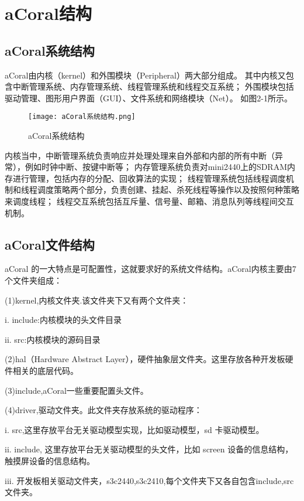 \chapter{aCoral结构}

\section{aCoral系统结构}
aCoral由内核（kernel）和外围模块（Peripheral）两大部分组成。
其中内核又包含中断管理系统、内存管理系统、线程管理系统和线程交互系统；
外围模块包括驱动管理、图形用户界面（GUI）、文件系统和网络模块（Net）。
如图2-1所示。

\begin{figure}[H]
	\texttt{[image: aCoral系统结构.png]}
	\caption{aCoral系统结构}
	\label{pica}
\end{figure}

内核当中，中断管理系统负责响应并处理处理来自外部和内部的所有中断（异常），例如时钟中断、按键中断等；
内存管理系统负责对mini2440上的SDRAM内存进行管理，包括内存的分配、回收算法的实现；
线程管理系统包括线程调度机制和线程调度策略两个部分，负责创建、挂起、杀死线程等操作以及按照何种策略来调度线程；
线程交互系统包括互斥量、信号量、邮箱、消息队列等线程间交互机制。

\section{aCoral文件结构}

aCoral 的一大特点是可配置性，这就要求好的系统文件结构。aCoral内核主要由7个文件夹组成：

(1)kernel,内核文件夹.该文件夹下又有两个文件夹：

	\chinesespace i. include:内核模块的头文件目录

	\chinesespace ii. src:内核模块的源码目录
 
(2)hal（Hardware Abstract Layer），硬件抽象层文件夹。这里存放各种开发板硬件相关的底层代码。

(3)include,aCoral一些重要配置头文件。

(4)driver,驱动文件夹。此文件夹存放系统的驱动程序：

	\chinesespace i. src,这里存放平台无关驱动模型实现，比如驱动模型，sd 卡驱动模型。

	\chinesespace ii. include, 这里存放平台无关驱动模型的头文件，比如 screen 设备的信息结构，触摸屏设备的信息结构。

	\chinesespace iii. 开发板相关驱动文件夹，s3c2440,s3c2410,每个文件夹下又各自包含include,src 文件夹。

